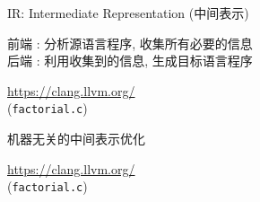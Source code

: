 
\begin{frame}{}
  \begin{center}
    IR: Intermediate Representation (中间表示)
    \vspace{0.50cm}


    \vspace{0.50cm}
    前端 : 分析源语言程序, 收集所有必要的信息 \\[8pt]
    后端 : 利用收集到的信息, 生成目标语言程序
  \end{center}
\end{frame}

\begin{frame}{}
\end{frame}

\begin{frame}{}
  \begin{center}

    \vspace{0.30cm}
    \url{https://clang.llvm.org/}\\[5pt]
    (\texttt{factorial.c})
  \end{center}
\end{frame}

\begin{frame}{}
  \begin{center}

    \vspace{0.50cm}
    机器无关的中间表示优化
  \end{center}
\end{frame}

\begin{frame}{}
  \begin{center}

    \vspace{0.30cm}
    \url{https://clang.llvm.org/}\\[5pt]
    (\texttt{factorial.c})
  \end{center}
\end{frame}

